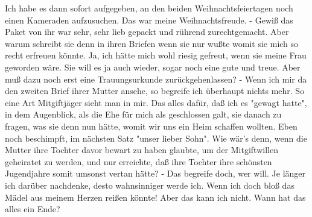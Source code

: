 \def\day{{\color{red} [31. Dezember 1944. fortgesetzt] }}
\mktitle

Ich habe es dann sofort aufgegeben, an den beiden Weihnachtsfeiertagen noch einen Kameraden aufzusuchen.
Das war meine Weihnachtsfreude.
- Gewi{\ss} das Paket von ihr war sehr, sehr lieb gepackt und r\"{u}hrend zurechtgemacht.
Aber warum schreibt sie denn in ihren Briefen wenn sie nur wu{\ss}te womit sie mich so recht erfreuen k\"{o}nnte.
Ja, ich h\"{a}tte mich wohl riesig gefreut, wenn sie meine Frau geworden w\"{a}re.
Sie will es ja auch wieder, sogar noch eine gute und treue.
Aber mu{\ss} dazu noch erst eine Trauungsurkunde zur\"{u}ckgehenlassen? -
Wenn ich mir da den zweiten Brief ihrer Mutter ansehe, so begreife ich \"{u}berhaupt nichts mehr.
So eine Art Mitgiftj\"{a}ger sieht man in mir.
Das alles daf\"{u}r, da{\ss} ich es "gewagt hatte", in dem Augenblick, als die Ehe f\"{u}r mich als geschlossen galt, sie danach zu fragen, was sie denn nun h\"{a}tte, womit wir uns ein Heim schaffen wollten.
Eben noch beschimpft, im n\"{a}chsten Satz "unser lieber Sohn".
Wie w\"{a}r's denn, wenn die Mutter ihre Tochter davor bewart zu haben glaubte, um der Mitgiftwillen geheiratet zu werden, und nur erreichte, da{\ss} ihre Tochter ihre sch\"{o}nsten Jugendjahre somit umsonst vertan h\"{a}tte? -
Das begreife doch, wer will.
Je l\"{a}nger ich dar\"{u}ber nachdenke, desto wahnsinniger werde ich.
Wenn ich doch blo{\ss} das M\"{a}del aus meinem Herzen rei{\ss}en k\"{o}nnte!
Aber das kann ich nicht.
Wann hat das alles ein Ende?

\clearpage

